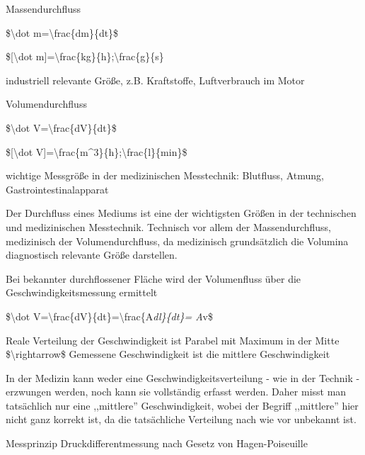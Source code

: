 \documentclass[a4paper]{article}
\begin{document}
\begin{multicols}{3}
  \begin{itemize*}
    \item Massendurchfluss
    \begin{itemize*}
      \item \$\textbackslash dot m=\textbackslash frac\{dm\}\{dt\}\$
      \item \${[}\textbackslash dot m{]}=\textbackslash frac\{kg\}\{h\};\textbackslash frac\{g\}\{s\}
      \item industriell relevante Größe, z.B. Kraftstoffe, Luftverbrauch im Motor
    \end{itemize*}
    \item Volumendurchfluss
    \begin{itemize*}
      \item \$\textbackslash dot V=\textbackslash frac\{dV\}\{dt\}\$
      \item \${[}\textbackslash dot V{]}=\textbackslash frac\{m\^{}3\}\{h\};\textbackslash frac\{l\}\{min\}\$
      \item wichtige Messgröße in der medizinischen Messtechnik: Blutfluss, Atmung, Gastrointestinalapparat
    \end{itemize*}
    \item Der Durchfluss eines Mediums ist eine der wichtigsten Größen in der technischen und medizinischen Messtechnik. Technisch vor allem der Massendurchfluss, medizinisch der Volumendurchfluss, da medizinisch grundsätzlich die Volumina diagnostisch relevante Größe darstellen.
    \item Bei bekannter durchflossener Fläche wird der Volumenfluss über die Geschwindigkeitsmessung ermittelt
    \begin{itemize*}
      \item \$\textbackslash dot V=\textbackslash frac\{dV\}\{dt\}=\textbackslash frac\{A\emph{dl\}\{dt\}= A}v\$
      \item Reale Verteilung der Geschwindigkeit ist Parabel mit Maximum in der Mitte \$\textbackslash rightarrow\$ Gemessene Geschwindigkeit ist die mittlere Geschwindigkeit
    \end{itemize*}
    \item In der Medizin kann weder eine Geschwindigkeitsverteilung - wie in der Technik - erzwungen werden, noch kann sie vollständig erfasst werden. Daher misst man tatsächlich nur eine ,,mittlere'' Geschwindigkeit, wobei der Begriff ,,mittlere'' hier nicht ganz korrekt ist, da die tatsächliche Verteilung nach wie vor unbekannt ist.
    \item Messprinzip Druckdifferentmessung nach Gesetz von Hagen-Poiseuille

\end{itemize*}
\end{multicols}
\end{document}
